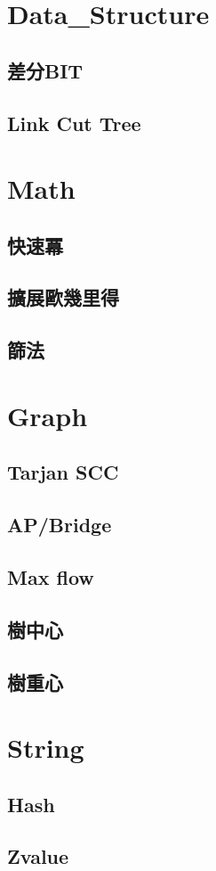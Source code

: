 \section{Data_Structure}
\subsection*{差分BIT}

\subsection{Link Cut Tree}


\section{Math}
\subsection{快速冪} 

\subsection{擴展歐幾里得}

\subsection*{篩法}


\section{Graph}
\subsection{Tarjan SCC} 

\subsection{AP/Bridge} 

\subsection{Max flow} 

\subsection*{樹中心}

\subsection*{樹重心}


\section{String}
\subsection{Hash} 

\subsection{Zvalue} 
